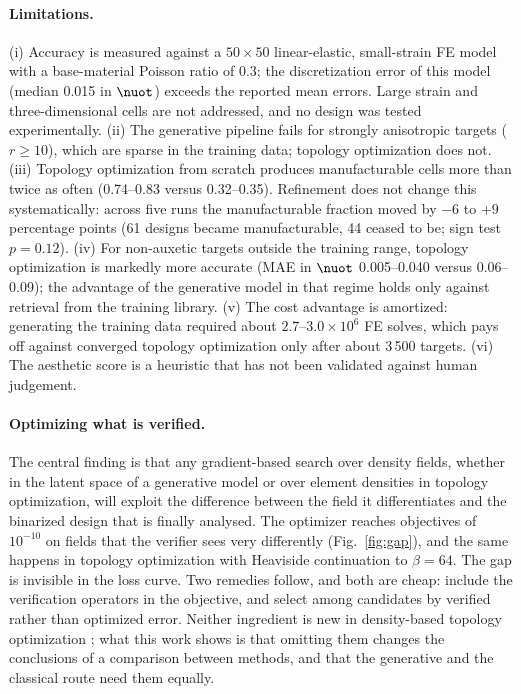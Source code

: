 \paragraph{Limitations.}
(i) Accuracy is measured against a $50\times50$ linear-elastic,
small-strain FE model with a base-material Poisson ratio of 0.3; the
discretization error of this model (median 0.015 in $\nuot$) exceeds the
reported mean errors. Large strain and three-dimensional cells are not
addressed, and no design was tested experimentally.
(ii) The generative pipeline fails for strongly anisotropic targets
($r\ge10$), which are sparse in the training data; topology optimization does
not.
(iii) Topology optimization from scratch produces manufacturable cells more than
twice as often (0.74--0.83 versus 0.32--0.35). Refinement does not
change this systematically: across five runs the manufacturable fraction
moved by $-6$ to $+9$ percentage points (61 designs became manufacturable,
44 ceased to be; sign test $p=0.12$).
(iv) For non-auxetic targets outside the training range, topology
optimization is markedly more accurate (MAE in $\nuot$ 0.005--0.040 versus
0.06--0.09); the advantage of the generative model in that regime holds only
against retrieval from the training library.
(v) The cost advantage is amortized: generating the training data required
about $2.7$--$3.0\times10^{6}$ FE solves, which pays off against converged
topology optimization only after about 3\,500 targets.
(vi) The aesthetic score is a heuristic that has not been validated against
human judgement.

\paragraph{Optimizing what is verified.}
The central finding is that any gradient-based search over density fields,
whether in the latent space of a generative model or over element densities
in topology optimization, will exploit the difference between the field it
differentiates and the binarized design that is finally analysed. The
optimizer reaches objectives of $10^{-10}$ on fields that the verifier sees
very differently (Fig.~\ref{fig:gap}), and the same happens in topology
optimization with Heaviside continuation to $\beta=64$. The gap is invisible
in the loss curve. Two remedies follow, and both are cheap: include the
verification operators in the objective, and select among candidates by
verified rather than optimized error. Neither ingredient is new in
density-based topology optimization \citep{guest2004achieving,wang2011projection};
what this work shows is that omitting them changes the conclusions of a
comparison between methods, and that the generative and the classical route
need them equally.

